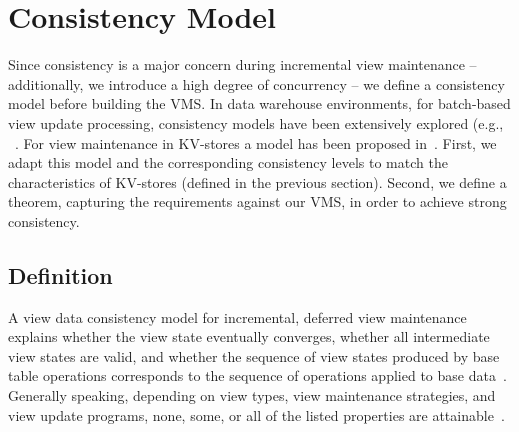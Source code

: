%
%
\section{Consistency Model}
\label{sec:consistency}

Since consistency is a major concern during incremental view
maintenance -- additionally, we introduce a high degree of concurrency --
we define a consistency model before building the VMS. 
In data warehouse environments, for batch-based view update
processing, consistency models have been extensively explored (e.g.,
~\cite{zhuge:view, wang:efficient, zhang:parallel, zhuge:strobe}. For
view maintenance in KV-stores a model has been proposed
in~\cite{jacobsen:viewmaintenance}. First, we adapt this model and the
corresponding consistency levels to match the characteristics of 
KV-stores (defined in the previous section). Second, we define a theorem, 
capturing the requirements against our VMS, in order to achieve strong
consistency.

%
%

\subsection{Definition} 
\label{subsec:definition} 

A view data consistency model for incremental, deferred view
maintenance explains whether the view state eventually converges,
whether all intermediate view states are valid, and whether the
sequence of view states produced by base table operations corresponds to
the sequence of operations applied to base data~\cite{zhuge:view,
  wang:efficient, zhang:parallel, zhuge:strobe,
  jacobsen:viewmaintenance}. Generally speaking, depending on view
types, view maintenance strategies, and view update programs, none,
some, or all of the listed properties are attainable~\cite{zhuge:view,
  wang:efficient, zhang:parallel, zhuge:strobe,
  jacobsen:viewmaintenance}.




